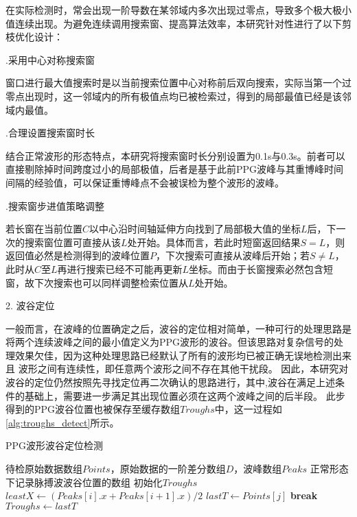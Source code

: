 在实际检测时，常会出现一阶导数在某邻域内多次出现过零点，导致多个极大极小值连续出现。为避免连续调用搜索窗、提高算法效率，本研究针对性进行了以下剪枝优化设计：

.采用中心对称搜索窗

窗口进行最大值搜索时是以当前搜索位置中心对称前后双向搜索，实际当第一个过零点出现时，这一邻域内的所有极值点均已被检索过，得到的局部最值已经是该邻域内最值。

.合理设置搜索窗时长

结合正常波形的形态特点，本研究将搜索窗时长分别设置为0.1s与0.3s。前者可以直接剔除掉时间跨度过小的局部极值，后者是基于此前PPG波峰与其重博峰时间间隔的经验值，可以保证重博峰点不会被误检为整个波形的波峰。

.搜索窗步进值策略调整

若长窗在当前位置$C$以中心沿时间轴延伸方向找到了局部极大值的坐标$L$后，下一次的搜索窗位置可直接从该$L$处开始。具体而言，若此时短窗返回结果$S=L$，则返回值必然是检测得到的波峰位置$P$，下次搜索可直接从波峰后开始；若$S\ne L$，
此时从$C$至$L$再进行搜索已经不可能再更新$L$坐标。而由于长窗搜索必然包含短窗，故下次搜索也可以同样调整检索位置从$L$处开始。

2. 波谷定位

一般而言，在波峰的位置确定之后，波谷的定位相对简单，一种可行的处理思路是将两个连续波峰之间的最小值定义为PPG波形的波谷。但该思路对复杂信号的处理效果欠佳，因为这种处理思路已经默认了所有的波形均已被正确无误地检测出来且
波形之间有连续性，即任意两个波形之间不存在其他干扰段。
因此，本研究对波谷的定位仍然按照先寻找定位再二次确认的思路进行，其中,波谷在满足上述条件的基础上，需要进一步满足其出现位置必须在这两个波峰之间的后半段。
此步得到的PPG波谷位置也被保存至缓存数组$Troughs$中，这一过程如\autoref{alg:troughs_detect}所示。
\begin{breakablealgorithm}
    \caption{PPG波形波谷定位检测}
    \label{alg:troughs_detect}
    \begin{algorithmic}[1] %
        \Require 待检原始数据数组$Points$，原始数据的一阶差分数组$D$，波峰数组$Peaks$
        \Ensure 正常形态下记录脉搏波波谷位置的数组
            \State 初始化$Troughs$
                \State $leastX \gets (Peaks[i].x + Peaks[i+1].x )/2$
                            \State $lastT \gets Points[j]$
                            \State \textbf{break}
                        \EndIf
                    \EndFor
                \State $Troughs \gets lastT$
            \EndFor
            \State {}
        \EndFunction
    \end{algorithmic}
\end{breakablealgorithm}

